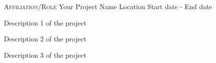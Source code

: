


\begin{cventries}


\cventry
{\textsc{Affiliation/Role}} %
{Your Project Name} %
{Location} %
{Start date - End date} %
{ %
\begin{cvitems}
\item {Description 1 of the project}
\item {Description 2 of the project}
\item {Description 3 of the project}
\end{cvitems}
}

\end{cventries}